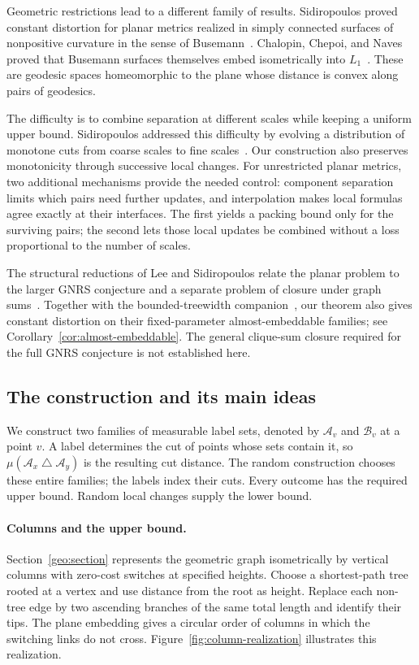 Geometric restrictions lead to a different family of results.
Sidiropoulos proved constant distortion for planar metrics realized
in simply connected surfaces of nonpositive curvature in the sense
of Busemann~\cite{Sidiropoulos13}. Chalopin, Chepoi, and Naves proved
that Busemann surfaces themselves embed isometrically into
$L_1$~\cite{CCN15}. These are geodesic spaces homeomorphic to the
plane whose distance is convex along pairs of geodesics.

The difficulty is to combine separation at different scales while
keeping a uniform upper bound. Sidiropoulos addressed this difficulty
by evolving a distribution of monotone cuts from coarse scales to
fine scales~\cite[Sections~4--5]{Sidiropoulos13}. Our construction
also preserves monotonicity through successive local changes.
For unrestricted planar metrics, two additional mechanisms provide
the needed control: component separation limits which pairs need
further updates, and interpolation makes local formulas agree
exactly at their interfaces. The first yields a packing bound only
for the surviving pairs; the second lets those local updates be
combined without a loss proportional to the number of scales.

The structural reductions of Lee and Sidiropoulos relate the planar
problem to the larger GNRS conjecture and a separate problem of
closure under graph sums~\cite{LS09}. Together with the
bounded-treewidth companion~\cite[Theorem~1.1]{Treewidth108}, our
theorem also gives constant distortion on their fixed-parameter
almost-embeddable families; see Corollary~\ref{cor:almost-embeddable}.
The general clique-sum closure required for the full GNRS conjecture
is not established here.

\subsection{The construction and its main ideas}

We construct two families of measurable label sets, denoted by
$\mathcal A_v$ and $\mathcal B_v$ at a point $v$.
A label determines the cut of points whose sets contain it, so
$\mu(\mathcal A_x\mathbin\triangle\mathcal A_y)$ is the resulting
cut distance. The random construction chooses these entire families;
the labels index their cuts. Every outcome has the required upper
bound. Random local changes supply the lower bound.

\paragraph{Columns and the upper bound.}
Section~\ref{geo:section} represents the geometric graph isometrically
by vertical columns with zero-cost switches at specified heights.
Choose a shortest-path tree rooted at a vertex and use distance from
the root as height. Replace each non-tree edge by two ascending
branches of the same total length and identify their tips. The
plane embedding gives a circular order of columns in which the
switching links do not cross. Figure~\ref{fig:column-realization}
illustrates this realization.

